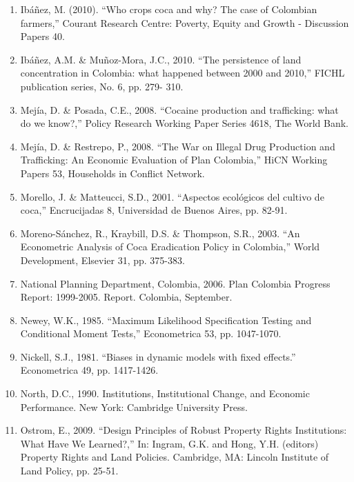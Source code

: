 \begin{enumerate}
\item Ib\'{a}\~{n}ez, M. (2010). ``Who crops coca and why? The case of Colombian farmers,'' Courant Research Centre: Poverty, Equity and Growth - Discussion Papers 40.

\item Ib\'{a}\~{n}ez, A.M. \& Mu\~{n}oz-Mora, J.C., 2010. ``The persistence of land concentration in Colombia: what happened between 2000 and 2010,'' FICHL publication series, No. 6, pp. 279- 310.

\item Mej\'{i}a, D. \& Posada, C.E., 2008. ``Cocaine production and trafficking: what do we know?,'' Policy Research Working Paper Series 4618, The World Bank.

\item Mej\'{i}a, D. \& Restrepo, P., 2008. ``The War on Illegal Drug Production and Trafficking: An Economic Evaluation of Plan Colombia,'' HiCN Working Papers 53, Households in Conflict Network.

\item Morello, J. \& Matteucci, S.D., 2001. ``Aspectos ecológicos del cultivo de coca,'' Encrucijadas 8, Universidad de Buenos Aires, pp. 82-91.

\item Moreno-S\'{a}nchez, R., Kraybill, D.S. \& Thompson, S.R., 2003. ``An Econometric Analysis of Coca Eradication Policy in Colombia,'' World Development, Elsevier 31, pp. 375-383.

\item National Planning Department, Colombia, 2006. Plan Colombia Progress Report: 1999-2005. Report. Colombia, September.

\item Newey, W.K., 1985. ``Maximum Likelihood Specification Testing and Conditional Moment Tests,'' Econometrica 53, pp. 1047-1070.

\item Nickell, S.J., 1981. ``Biases in dynamic models with fixed effects.'' Econometrica 49, pp. 1417-1426.

\item North, D.C., 1990. Institutions, Institutional Change, and Economic Performance. New York: Cambridge University Press.

\item Ostrom, E., 2009. ``Design Principles of Robust Property Rights Institutions: What Have We Learned?,'' In: Ingram, G.K. and Hong, Y.H. (editors) Property Rights and Land Policies. Cambridge, MA: Lincoln Institute of Land Policy, pp. 25-51.


\end{enumerate}
